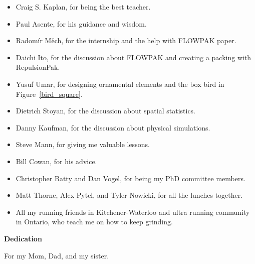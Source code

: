 \begin{itemize}  
\item Craig S. Kaplan, for being the best teacher.
\item Paul Asente, for his guidance and wisdom. 
\item Radom\'ir M\v{e}ch, for the internship and the help with FLOWPAK paper. 
\item Daichi Ito, for the discussion about FLOWPAK and creating a packing with RepulsionPak.
\item Yusuf Umar, for designing ornamental elements and the box bird in Figure~\ref{bird_square}.
\item Dietrich Stoyan, for the discussion about spatial statistics.
\item Danny Kaufman, for the discussion about physical simulations.
\item Steve Mann, for giving me valuable lessons.
\item Bill Cowan, for his advice.
\item Christopher Batty and Dan Vogel, for being my PhD committee members.
\item Matt Thorne, Alex Pytel, and Tyler Nowicki, for all the lunches together. 
\item All my running friends in Kitchener-Waterloo and ultra running community in \mbox{Ontario}, 
who teach me on how to keep grinding.
\end{itemize}

\cleardoublepage


\begin{center}\textbf{Dedication}\end{center}

For my Mom, Dad, and my sister.
\cleardoublepage

\renewcommand\contentsname{Table of Contents}
\tableofcontents
\cleardoublepage
{}    %

\listoftables
\cleardoublepage
{}		%

\listoffigures
\cleardoublepage
{}		%

\printglossaries
\cleardoublepage
{}		%


